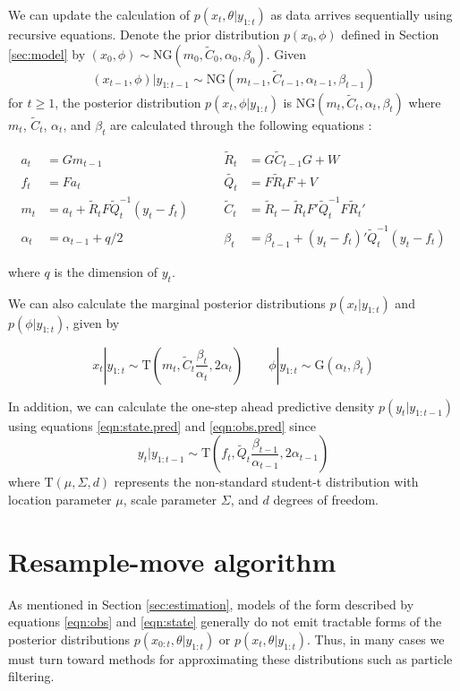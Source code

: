 \documentclass{article}
\begin{document}
We can update the calculation of $p(x_t,\theta|y_{1:t})$ as data arrives sequentially using recursive equations. Denote the prior distribution $p(x_0, \phi)$ defined in Section \ref{sec:model} by $(x_0, \phi) \sim \mbox{NG}(m_0, \tilde{C}_0, \alpha_0, \beta_0)$. Given \[(x_{t-1},\phi)|y_{1:t-1} \sim \mbox{NG}(m_{t-1},\tilde{C}_{t-1}, \alpha_{t-1}, \beta_{t-1})\]
\noindent for $t \ge 1$, the posterior distribution $p(x_t,\phi|y_{1:t})$ is $\mbox{NG}(m_t,\tilde{C}_t,\alpha_t,\beta_t)$ where $m_t$, $\tilde{C}_t$, $\alpha_t$, and $\beta_t$ are calculated through the following equations \citep{petris2009dynamic}:

\begin{align}
a_t &= Gm_{t-1} &\qquad \tilde{R}_t &= G\tilde{C}_{t-1}G + W \label{eqn:state.pred} \\
f_t &= Fa_t &\qquad \tilde{Q_t} &= F\tilde{R}_tF + V \label{eqn:obs.pred} \\
m_t &= a_t + \tilde{R}_tF\tilde{Q}_t^{-1}(y_t-f_t) &\qquad \tilde{C}_t &= \tilde{R}_t - \tilde{R}_tF'\tilde{Q}_t^{-1}F\tilde{R}_t' \\
\alpha_t &= \alpha_{t-1} + q / 2 &\qquad \beta_t &= \beta_{t-1} + (y_t-f_t)'\tilde{Q}_t^{-1}(y_t-f_t)
\end{align}

\noindent where $q$ is the dimension of $y_t$.

We can also calculate the marginal posterior distributions $p(x_t|y_{1:t})$ and $p(\phi|y_{1:t})$, given by

\begin{equation}
x_t|y_{1:t} \sim \mbox{T}(m_t,\tilde{C}_t \frac{\beta_t}{\alpha_t},2\alpha_t) \qquad \phi|y_{1:t} \sim \mbox{G}(\alpha_t,\beta_t) \label{eqn:margpost}
\end{equation}

In addition, we can calculate the one-step ahead predictive density $p(y_t|y_{1:t-1})$ using equations \eqref{eqn:state.pred} and \eqref{eqn:obs.pred} since \[y_t|y_{1:t-1} \sim \mbox{T}(f_t,\tilde{Q}_t \frac{\beta_{t-1}}{\alpha_{t-1}},2\alpha_{t-1})\]
\noindent where $\mbox{T}(\mu,\Sigma,d)$ represents the non-standard student-t distribution with location parameter $\mu$, scale parameter $\Sigma$, and $d$ degrees of freedom.

\section{Resample-move algorithm} \label{sec:rm}

As mentioned in Section \ref{sec:estimation}, models of the form described by equations \eqref{eqn:obs} and \eqref{eqn:state} generally do not emit tractable forms of the posterior distributions $p(x_{0:t},\theta|y_{1:t})$ or $p(x_t,\theta|y_{1:t})$. Thus, in many cases we must turn toward methods for approximating these distributions such as particle filtering.
\end{document}
